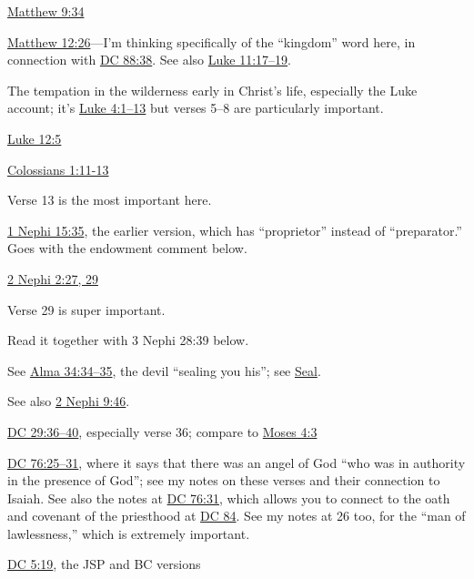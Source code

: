		\begin{compactitem}
			\item \hyperref[MATTHEW-9-34]{Matthew 9:34}
			\item \hyperref[MATTHEW-12-26]{Matthew 12:26}---I'm thinking specifically of the ``kingdom'' word here, in connection with \hyperref[DC88-38]{DC 88:38}. See also \hyperref[LUKE-11-18]{Luke 11:17--19}.
			\item The tempation in the wilderness early in Christ's life, especially the Luke account; it's \hyperref[LUKE-4-1]{Luke 4:1--13} but verses 5--8 are particularly important.
			\item \hyperref[LUKE-12-5]{Luke 12:5}
			\item \hyperref[COLOSSIANS-1-11]{Colossians 1:11-13}
				\begin{compactitem}
					\item Verse 13 is the most important here.
				\end{compactitem}
			\item \hyperref[1NEPHI-15-35]{1 Nephi 15:35}, the earlier version, which has ``proprietor'' instead of ``preparator.'' Goes with the endowment comment below.
			\item \hyperref[2NEPHI-2-27]{2 Nephi 2:27, 29}
				\begin{compactitem}
					\item Verse 29 is super important.
					\item Read it together with 3 Nephi 28:39 below.
				\end{compactitem}
			\item See \hyperref[ALMA-34-35]{Alma 34:34--35}, the devil ``sealing you his''; see \hyperref[SEAL]{Seal}.
				\begin{compactitem}
					\item See also \hyperref[2NEPHI-9-46]{2 Nephi 9:46}.
				\end{compactitem}
			\item \hyperref[DC29-36]{DC 29:36--40}, especially verse 36; compare to \hyperref[MOSES-4-3]{Moses 4:3}
			\item \hyperref[DC76-25]{DC 76:25--31}, where it says that there was an angel of God ``who was in authority in the presence of God''; see my notes on these verses and their connection to Isaiah. See also the notes at \hyperref[DC76-31]{DC 76:31}, which allows you to connect to the oath and covenant of the priesthood at \hyperref[DC84]{DC 84}. See my notes at 26 too, for the ``man of lawlessness,'' which is extremely important.
			\item \hyperref[DC5-19]{DC 5:19}, the JSP and BC versions

\end{compactitem}
